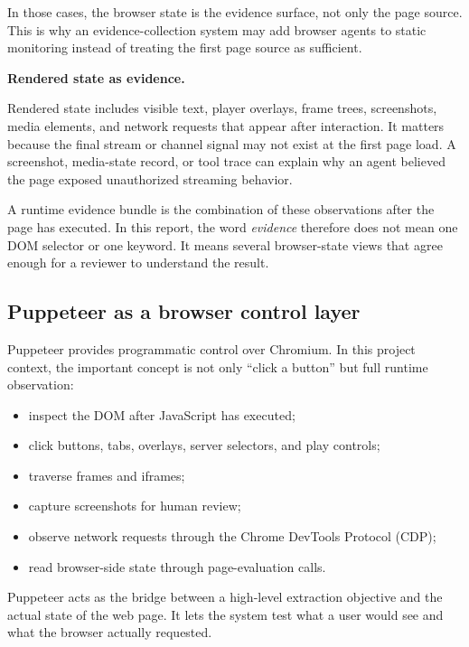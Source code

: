 In those cases, the browser state is the evidence surface, not only the page source.
This is why an evidence-collection system may add browser agents to static monitoring
instead of treating the first page source as sufficient.

\textbf{Rendered state as evidence.}

Rendered state includes visible text, player overlays, frame trees, screenshots, media
elements, and network requests that appear after interaction. It matters because the
final stream or channel signal may not exist at the first page load. A screenshot,
media-state record, or tool trace can explain why an agent believed the page
exposed unauthorized streaming behavior.

A runtime evidence bundle is the combination of these observations after the page has
executed. In this report, the word \emph{evidence} therefore does not mean one DOM
selector or one keyword. It means several browser-state views that agree enough for a
reviewer to understand the result.



\subsection{Puppeteer as a browser control layer}

Puppeteer provides programmatic control over Chromium. In this project context, the
important concept is not only ``click a button'' but full runtime observation:

\begin{itemize}
  \item inspect the DOM after JavaScript has executed;
  \item click buttons, tabs, overlays, server selectors, and play controls;
  \item traverse frames and iframes;
  \item capture screenshots for human review;
  \item observe network requests through the Chrome DevTools Protocol (CDP);
  \item read browser-side state through page-evaluation calls.
\end{itemize}

Puppeteer acts as the bridge between a high-level extraction objective and the
actual state of the web page. It lets the system test what a user would see and what the
browser actually requested.

